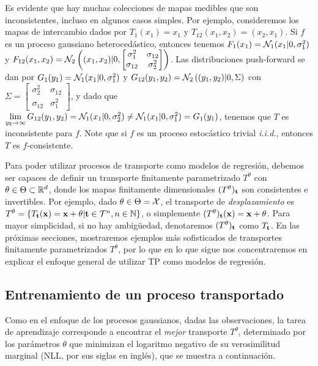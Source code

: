 Es evidente que hay muchas colecciones de mapas medibles que son inconsistentes, incluso en algunos casos simples. Por ejemplo, consideremos los mapas de intercambio dados por \(T_1(x_1) = x_1\) y \(T_{12}(x_1,x_2) = (x_2,x_1)\). Si \(f\) es un proceso gaussiano heterocedástico, entonces tenemos \(F_1(x_1) = \mathcal{N}_1(x_1|0,\sigma_1^2)\) y \(F_{12}(x_1, x_2)=\mathcal{N}_2\left((x_1, x_2)|0,\begin{bmatrix} \sigma_1^2 & \sigma_{12} \\ \sigma_{12} & \sigma_2^2 \end{bmatrix}\right)\). Las distribuciones push-forward se dan por \(G_1(y_1)=\mathcal{N}_1(x_1|0,\sigma_1^2)\) y \(G_{12}(y_1,y_2)=\mathcal{N}_2\left((y_1, y_2)\vert 0,\Sigma\right)\) con \(\Sigma = \begin{bmatrix} \sigma_2^2 & \sigma_{12} \\ \sigma_{12} & \sigma_1^2 \end{bmatrix}\), y dado que \(\lim\limits_{y_2 \to \infty} G_{12}(y_1,y_2) = \mathcal{N}_1(x_1 \vert 0,\sigma_2^2) \neq \mathcal{N}_1(x_1|0,\sigma_1^2) = G_1(y_1)\), tenemos que \(T\) es inconsistente para \(f\). Note que si \(f\) es un proceso estocástico trivial \emph{i.i.d.}, entonces \(T\) es \(f\)-consistente.

Para poder utilizar procesos de transporte como modelos de regresión, debemos ser capaces de definir un transporte finitamente parametrizado \(T^\theta\) con \(\theta \in \Theta \subset \mathbb{R}^d\), donde los mapas finitamente dimensionales \((T^\theta)_{\mathbf{t}}\) son consistentes e invertibles. Por ejemplo, dado \(\theta \in \Theta = \mathcal{X}\), el transporte de \emph{desplazamiento} es \(T^\theta =\{T_{\mathbf{t}}(\mathbf{x}) = \mathbf{x} + \theta | \mathbf{t} \in \mathcal{T}^n, n \in \mathbb{N}\}\), o simplemente \((T^\theta)_{\mathbf{t}}(\mathbf{x}) = \mathbf{x} + \theta\). Para mayor simplicidad, si no hay ambigüedad, denotaremos \((T^\theta)_{\mathbf{t}}\) como \(T_{\mathbf{t}}\). En las próximas secciones, mostraremos ejemplos más sofisticados de transportes finitamente parametrizados \(T^\theta\), por lo que en lo que sigue nos concentraremos en explicar el enfoque general de utilizar TP como modelos de regresión.

\subsection{Entrenamiento de un proceso transportado}

Como en el enfoque de los procesos gaussianos, dadas las observaciones, la tarea de aprendizaje corresponde a encontrar el \emph{mejor} transporte \(T^\theta\), determinado por los parámetros \(\theta\) que minimizan el logaritmo negativo de su verosimilitud marginal (NLL, por sus siglas en inglés), que se muestra a continuación.

